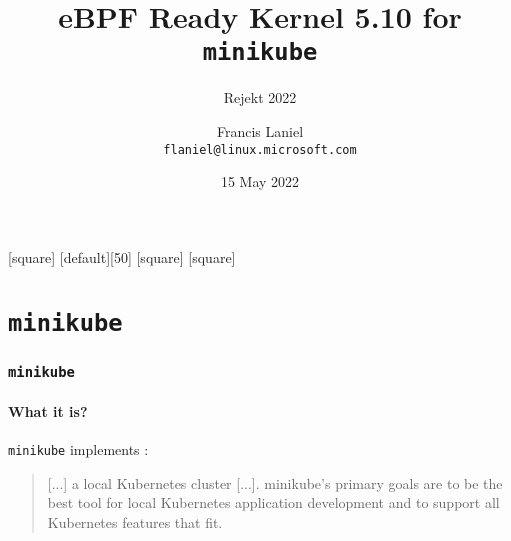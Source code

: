 \documentclass[table, trans, aspectratio = 169]{beamer}
\title[eBPF ready kernel 5.10 for \texttt{minikube} (Rejekt 2022)]{eBPF Ready Kernel 5.10 for \texttt{minikube}}
\subtitle{Rejekt 2022}
\author[Francis Laniel (\texttt{flaniel@linux.microsoft.com})]{Francis Laniel\\\texttt{flaniel@linux.microsoft.com}}
\date{15 May 2022}
\begin{document}
	[square]
	[default][50]
	[square]
	[square]

	\maketitle

	\section{\texttt{minikube}}
	\begin{frame}
		\frametitle{\texttt{minikube}}
		\framesubtitle{What it is?}

		\texttt{minikube} implements \cite{minikube_contributors_minikube_nodate}:
		\begin{quote}
			[...] a local Kubernetes cluster [...]. minikube's primary goals are to be the best tool for local Kubernetes application development and to support all Kubernetes features that fit.
		\end{quote}

		\bigskip

	\end{frame}
\end{document}
